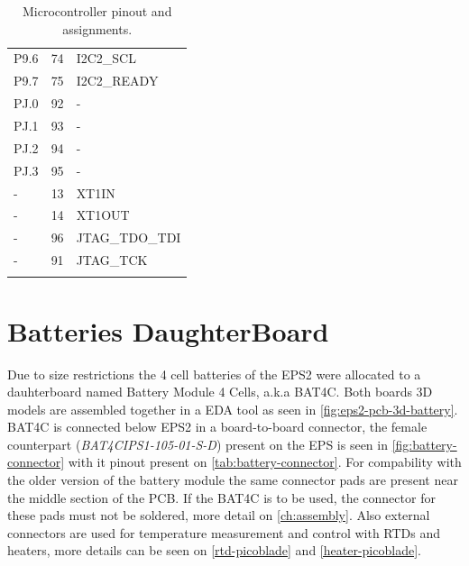 \begin{longtable}{lcl}
    P9.6              & 74                  & I2C2\_SCL             \\
    P9.7              & 75                  & I2C2\_READY           \\
    \midrule
    PJ.0              & 92                  & -                     \\
    PJ.1              & 93                  & -                     \\
    PJ.2              & 94                  & -                     \\
    PJ.3              & 95                  & -                     \\
    \midrule
    -                 & 13                  & XT1IN                 \\
    -                 & 14                  & XT1OUT                \\
    -                 & 96                  & JTAG\_TDO\_TDI        \\
    -                 & 91                  & JTAG\_TCK             \\
    \bottomrule[1.5pt]
    \caption{Microcontroller pinout and assignments.}
    \label{tab:mcu-pinout}
\end{longtable}

\section{Batteries DaughterBoard}

Due to size restrictions the 4 cell batteries of the EPS2 were allocated to a dauhterboard named Battery Module 4 Cells, a.k.a BAT4C\cite{bat4c}. Both boards 3D models are assembled together in a EDA tool as seen in \autoref{fig:eps2-pcb-3d-battery}. BAT4C is connected below EPS2 in a board-to-board connector, the female counterpart (\textit{BAT4CIPS1-105-01-S-D}) present on the EPS is seen in \autoref{fig:battery-connector} with it pinout present on \autoref{tab:battery-connector}. For compability with the older version of the battery module the same connector pads are present near the middle section of the PCB. If the BAT4C is to be used, the connector for these pads must not be soldered, more detail on \autoref{ch:assembly}. Also external connectors are used for temperature measurement and control with RTDs and heaters, more details can be seen on \autoref{rtd-picoblade} and \autoref{heater-picoblade}. 

